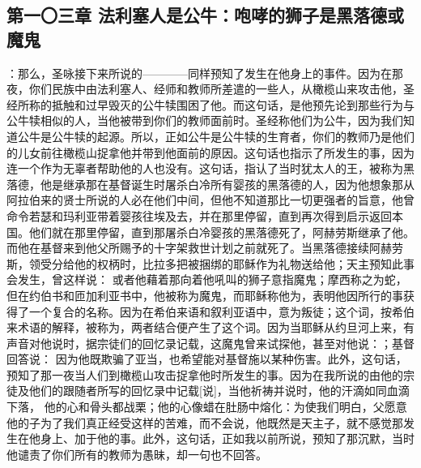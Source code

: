 
\subsection{第一〇三章 法利塞人是公牛：咆哮的狮子是黑落德或魔鬼}

：那么，圣咏接下来所说的————同样预知了发生在他身上的事件。因为在那夜，你们民族中由法利塞人、经师和教师所差遣的一些人，从橄榄山来攻击他，圣经所称的抵触和过早毁灭的公牛犊围困了他。而这句话，是他预先论到那些行为与公牛犊相似的人，当他被带到你们的教师面前时。圣经称他们为公牛，因为我们知道公牛是公牛犊的起源。所以，正如公牛是公牛犊的生育者，你们的教师乃是他们的儿女前往橄榄山捉拿他并带到他面前的原因。这句话也指示了所发生的事，因为连一个作为无辜者帮助他的人也没有。这句话，指认了当时犹太人的王，被称为黑落德，他是继承那在基督诞生时屠杀白冷所有婴孩的黑落德的人，因为他想象那从阿拉伯来的贤士所说的人必在他们中间，但他不知道那比一切更强者的旨意，他曾命令若瑟和玛利亚带着婴孩往埃及去，并在那里停留，直到再次得到启示返回本国。他们就在那里停留，直到那屠杀白冷婴孩的黑落德死了，阿赫劳斯继承了他。而他在基督来到他父所赐予的十字架救世计划之前就死了。当黑落德接续阿赫劳斯，领受分给他的权柄时，比拉多把被捆绑的耶稣作为礼物送给他；天主预知此事会发生，曾这样说： 或者他藉着那向着他吼叫的狮子意指魔鬼；摩西称之为蛇，但在约伯书和匝加利亚书中，他被称为魔鬼，而耶稣称他为，表明他因所行的事获得了一个复合的名称。因为在希伯来语和叙利亚语中，意为叛徒；这个词，按希伯来术语的解释，被称为，两者结合便产生了这个词。因为当耶稣从约旦河上来，有声音对他说时，据宗徒们的回忆录记载，这魔鬼曾来试探他，甚至对他说：；基督回答说： 因为他既欺骗了亚当，也希望能对基督施以某种伤害。此外，这句话，预知了那一夜当人们到橄榄山攻击捉拿他时所发生的事。因为在我所说的由他的宗徒及他们的跟随者所写的回忆录中记载[说]，当他祈祷并说时，他的汗滴如同血滴下落， 他的心和骨头都战栗；他的心像蜡在肚肠中熔化：为使我们明白，父愿意他的子为了我们真正经受这样的苦难，而不会说，他既然是天主子，就不感觉那发生在他身上、加于他的事。此外，这句话，正如我以前所说，预知了那沉默，当时他谴责了你们所有的教师为愚昧，却一句也不回答。\par

